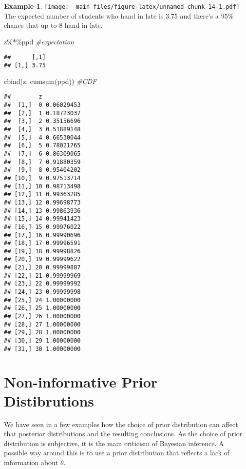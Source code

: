 \documentclass[
]{book}
\newenvironment{Shaded}{\begin{snugshade}}{\end{snugshade}}
\newcommand{\CommentTok}[1]{\textcolor[rgb]{0.56,0.35,0.01}{\textit{#1}}}
\newcommand{\FunctionTok}[1]{\textcolor[rgb]{0.00,0.00,0.00}{#1}}
\newcommand{\NormalTok}[1]{#1}
\newcommand{\SpecialCharTok}[1]{\textcolor[rgb]{0.00,0.00,0.00}{#1}}
\theoremstyle{definition}
\theoremstyle{definition}
\newtheorem{example}{Example}[chapter]
\theoremstyle{definition}
\theoremstyle{definition}
\theoremstyle{remark}
\begin{document}
\begin{example}
\texttt{[image: \_main\_files/figure-latex/unnamed-chunk-14-1.pdf]}
The expected number of students who hand in late is 3.75 and there's a 95\% chance that up to 8 hand in late.

\begin{Shaded}
\begin{Highlighting}[]
\NormalTok{z}\SpecialCharTok{\%*\%}\NormalTok{ppd }\CommentTok{\#expectation}
\end{Highlighting}
\end{Shaded}

\begin{verbatim}
##      [,1]
## [1,] 3.75
\end{verbatim}

\begin{Shaded}
\begin{Highlighting}[]
\FunctionTok{cbind}\NormalTok{(z, }\FunctionTok{cumsum}\NormalTok{(ppd)) }\CommentTok{\#CDF}
\end{Highlighting}
\end{Shaded}

\begin{verbatim}
##        z           
##  [1,]  0 0.06029453
##  [2,]  1 0.18723037
##  [3,]  2 0.35156696
##  [4,]  3 0.51889148
##  [5,]  4 0.66530044
##  [6,]  5 0.78021765
##  [7,]  6 0.86309065
##  [8,]  7 0.91880359
##  [9,]  8 0.95404202
## [10,]  9 0.97513714
## [11,] 10 0.98713498
## [12,] 11 0.99363285
## [13,] 12 0.99698773
## [14,] 13 0.99863936
## [15,] 14 0.99941423
## [16,] 15 0.99976022
## [17,] 16 0.99990696
## [18,] 17 0.99996591
## [19,] 18 0.99998826
## [20,] 19 0.99999622
## [21,] 20 0.99999887
## [22,] 21 0.99999969
## [23,] 22 0.99999992
## [24,] 23 0.99999998
## [25,] 24 1.00000000
## [26,] 25 1.00000000
## [27,] 26 1.00000000
## [28,] 27 1.00000000
## [29,] 28 1.00000000
## [30,] 29 1.00000000
## [31,] 30 1.00000000
\end{verbatim}

\end{example}

\hypertarget{non-informative-prior-distibrutions}{%
\section{Non-informative Prior Distibrutions}\label{non-informative-prior-distibrutions}}

We have seen in a few examples how the choice of prior distribution can affect that posterior distributions and the resulting conclusions. As the choice of prior distribution is subjective, it is the main criticism of Bayesian inference. A possible way around this is to use a prior distribution that reflects a lack of information about \(\theta\).
\end{document}
